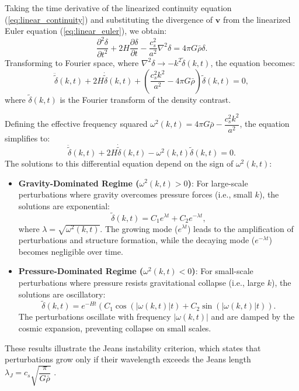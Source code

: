Taking the time derivative of the linearized continuity equation (\ref{eq:linear_continuity}) and substituting the divergence of \( \boldsymbol{v} \) from the linearized Euler equation (\ref{eq:linear_euler}), we obtain:
\begin{equation}
    \dfrac{\partial^2 \delta}{\partial t^2} + 2H \dfrac{\partial \delta}{\partial t} - \dfrac{c_s^2}{a^2} \nabla^2 \delta = 4\pi G \bar{\rho} \delta.
\end{equation}
Transforming to Fourier space, where \( \nabla^2 \delta \rightarrow -k^2 \tilde{\delta}(k, t) \), the equation becomes:
\begin{equation}
    \label{eq:delta_fourier}
    \ddot{\tilde{\delta}}(k, t) + 2H \dot{\tilde{\delta}}(k, t) + \left( \dfrac{c_s^2 k^2}{a^2} - 4\pi G \bar{\rho} \right) \tilde{\delta}(k, t) = 0,
\end{equation}
where \( \tilde{\delta}(k, t) \) is the Fourier transform of the density contrast.

Defining the effective frequency squared \( \omega^2(k, t) = 4\pi G \bar{\rho} - \dfrac{c_s^2 k^2}{a^2} \), the equation simplifies to:
\begin{equation}
    \ddot{\tilde{\delta}}(k, t) + 2H \dot{\tilde{\delta}}(k, t) - \omega^2(k, t) \tilde{\delta}(k, t) = 0.
\end{equation}
The solutions to this differential equation depend on the sign of \( \omega^2(k, t) \):
\begin{itemize}
    \item \textbf{Gravity-Dominated Regime (\( \omega^2(k, t) > 0 \))}: For large-scale perturbations where gravity overcomes pressure forces (i.e., small \( k \)), the solutions are exponential:
    \begin{equation}
        \label{eq:delta_growing_mode}
        \tilde{\delta}(k, t) = C_1 e^{\lambda t} + C_2 e^{-\lambda t},
    \end{equation}
    where \( \lambda = \sqrt{\omega^2(k, t)} \). The growing mode (\( e^{\lambda t} \)) leads to the amplification of perturbations and structure formation, while the decaying mode (\( e^{-\lambda t} \)) becomes negligible over time.
    \item \textbf{Pressure-Dominated Regime (\( \omega^2(k, t) < 0 \))}: For small-scale perturbations where pressure resists gravitational collapse (i.e., large \( k \)), the solutions are oscillatory:
    \begin{equation}
        \label{eq:delta_oscillatory_mode}
        \tilde{\delta}(k, t) = e^{-Ht} \left( C_1 \cos{\left( |\omega(k, t)| t \right)} + C_2 \sin{\left( |\omega(k, t)| t \right)} \right).
    \end{equation}
    The perturbations oscillate with frequency \( |\omega(k, t)| \) and are damped by the cosmic expansion, preventing collapse on small scales.
\end{itemize}
These results illustrate the Jeans instability criterion, which states that perturbations grow only if their wavelength exceeds the Jeans length \( \lambda_J = c_s \sqrt{\dfrac{\pi}{G \bar{\rho}}} \) \citep{1902RSPTA.199....1J}.


